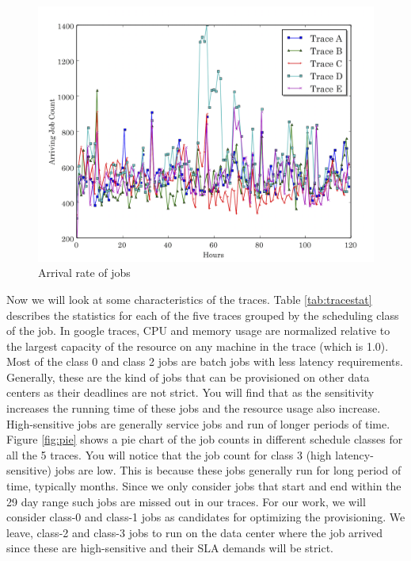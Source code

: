 \documentclass[letterpaper,twocolumn,12pt]{article}
\begin{document}
\begin{figure}[] 
\centering
\includegraphics[scale=0.25]{arrivalrate.png}
\caption{Arrival rate of jobs }
\label{fig:arrivalrate}
\end{figure}

Now we will look at some characteristics of the traces. Table \ref{tab:tracestat} describes the statistics for each of the five traces grouped by the scheduling class of the job. In google traces, CPU and memory usage are normalized relative to the largest capacity of the resource on any machine in the trace (which is 1.0). Most of the class 0 and class 2 jobs are batch jobs with less latency requirements. Generally, these are the kind of jobs that can be provisioned on other data centers as their deadlines are not strict.  You will find that as the sensitivity increases the running time of these jobs and the resource usage also increase. High-sensitive jobs are generally service jobs and run of longer periods of time. Figure \ref{fig:pie} shows a pie chart of the job counts in different schedule classes for all the 5 traces. You will notice that the job count for class 3 (high latency-sensitive) jobs are low. This is because these jobs generally run for long period of time, typically months. Since we only consider jobs that start and end within the 29 day range such jobs are missed out in our traces. For our work, we will consider class-0 and class-1 jobs as candidates for optimizing the provisioning. We leave, class-2 and class-3 jobs to run on the data center where the job arrived since these are high-sensitive and their SLA demands will be strict.
\end{document}
